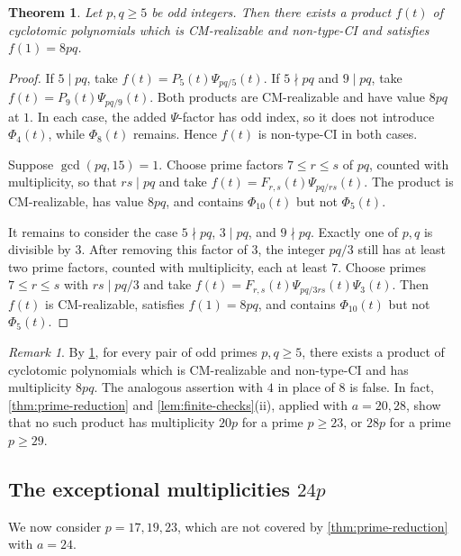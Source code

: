 \documentclass[11pt,a4paper]{amsart}
\newtheorem{theorem}{Theorem}[section]
\theoremstyle{definition}
\theoremstyle{remark}
\newtheorem{remark}[remark]{Remark}
\begin{document}
\begin{theorem}\label{thm:8pq}
Let $p,q\ge5$ be odd integers. Then there exists a product $f(t)$ of cyclotomic polynomials which is CM-realizable and non-type-CI and satisfies $f(1)=8pq$.
\end{theorem}
\begin{proof}
If $5\mid pq$, take $f(t)=P_5(t)\Psi_{pq/5}(t)$. If $5\nmid pq$ and $9\mid pq$, take $f(t)=P_9(t)\Psi_{pq/9}(t)$. Both products are CM-realizable and have value $8pq$ at $1$. In each case, the added $\Psi$-factor has odd index, so it does not introduce $\Phi_4(t)$, while $\Phi_8(t)$ remains. Hence $f(t)$ is non-type-CI in both cases.

Suppose $\gcd(pq,15)=1$. Choose prime factors $7\le r\le s$ of $pq$, counted with multiplicity, so that $rs\mid pq$ and take $f(t)=F_{r,s}(t)\Psi_{pq/rs}(t)$. The product is CM-realizable, has value $8pq$, and contains $\Phi_{10}(t)$ but not $\Phi_5(t)$.

It remains to consider the case $5\nmid pq$, $3\mid pq$, and $9\nmid pq$. Exactly one of $p,q$ is divisible by $3$. After removing this factor of $3$, the integer $pq/3$ still has at least two prime factors, counted with multiplicity, each at least $7$. Choose primes $7\le r\le s$ with $rs\mid pq/3$ and take $f(t)=F_{r,s}(t)\Psi_{pq/3rs}(t)\Psi_3(t)$. Then $f(t)$ is CM-realizable, satisfies $f(1)=8pq$, and contains $\Phi_{10}(t)$ but not $\Phi_5(t)$.
\end{proof}
\begin{remark}\label{rem:4pq-nonexistence}
By \cref{thm:8pq}, for every pair of odd primes $p,q\ge5$, there exists a product of cyclotomic polynomials which is CM-realizable and non-type-CI and has multiplicity $8pq$. The analogous assertion with $4$ in place of $8$ is false. In fact, \cref{thm:prime-reduction} and \cref{lem:finite-checks}\textup{(ii)}, applied with $a=20,28$, show that no such product has multiplicity $20p$ for a prime $p\ge23$, or $28p$ for a prime $p\ge29$.
\end{remark}

\subsection{The exceptional multiplicities \texorpdfstring{$24p$}{24p}}\label{subsec:24p}

We now consider $p=17,19,23$, which are not covered by \cref{thm:prime-reduction} with $a=24$.
\end{document}
